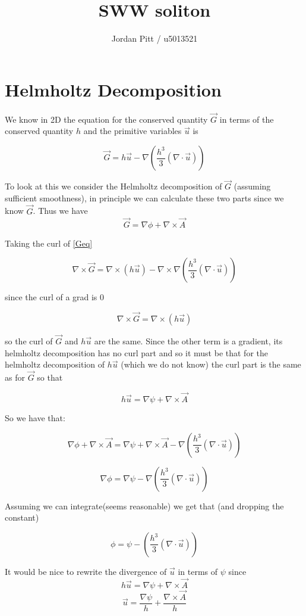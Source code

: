 \documentclass[12pt]{article}
\begin{document}
\title{SWW soliton}
\author{Jordan Pitt / u5013521}

\section{Helmholtz Decomposition}
We know in 2D the equation for the conserved quantity $\vec{G}$ in terms of the conserved quantity $h$ and the primitive variables $\vec{u}$ is

\begin{equation}
\label{Geq}
\vec{G} = h\vec{u} - \nabla\left(\frac{h^3}{3} \left(\nabla \cdot \vec{u}\right)\right)
\end{equation}

To look at this we consider the Helmholtz decomposition of $\vec{G}$ (assuming sufficient smoothness), in principle we can calculate these two parts since we know $\vec{G}$. Thus we have
\[\vec{G} = \nabla \phi + \nabla \times \vec{A}\] 

Taking the curl of \eqref{Geq}

\[\nabla \times \vec{G} = \nabla \times\left(h\vec{u} \right)-\nabla \times \nabla\left(\frac{h^3}{3} \left(\nabla \cdot \vec{u}\right)\right)\]

since the curl of a grad is 0

\[\nabla \times \vec{G} = \nabla \times\left(h\vec{u} \right)\]

so the curl of $\vec{G}$ and $h\vec{u}$ are the same. Since the other term is a gradient, its helmholtz decomposition has no curl part and so it must be that for the helmholtz decomposition of $h\vec{u}$ (which we do not know) the curl part is the same as for $\vec{G}$ so that

\[h\vec{u} = \nabla \psi + \nabla \times \vec{A}\]

So we have that:

\[\nabla \phi + \nabla \times \vec{A} = \nabla \psi + \nabla \times \vec{A} - \nabla\left(\frac{h^3}{3} \left(\nabla \cdot \vec{u}\right)\right)\]

\[\nabla \phi = \nabla \psi - \nabla\left(\frac{h^3}{3} \left(\nabla \cdot \vec{u}\right)\right)\]

Assuming we can integrate(seems reasonable) we get that (and dropping the constant)

\[\phi = \psi - \left(\frac{h^3}{3} \left(\nabla \cdot \vec{u}\right)\right)\]

It would be nice to rewrite the divergence of $\vec{u}$ in terms of $\psi$ since 
\[h\vec{u} = \nabla \psi + \nabla \times \vec{A}\]
\[\vec{u} = \frac{\nabla \psi}{h} + \frac{\nabla \times \vec{A}}{h} \]
\end{document}
